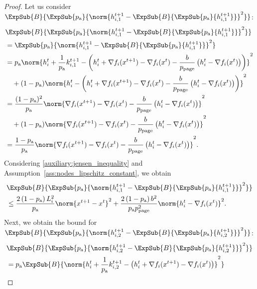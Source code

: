 \documentclass{article}
\newcommand*{\probavailable}{\ensuremath{p_{\textnormal{a}}}}
\newcommand*{\probpage}{\ensuremath{p_{\text{page}}}}
\begin{document}
\begin{proof}
  Let us consider $\ExpSub{B}{\ExpSub{\probavailable}{\norm{h^{t+1}_{i,1} - \ExpSub{B}{\ExpSub{\probavailable}{h^{t+1}_{i,1}}}}^2}}$:
  \begin{align*}
    &\ExpSub{B}{\ExpSub{\probavailable}{\norm{h^{t+1}_{i,1} - \ExpSub{B}{\ExpSub{\probavailable}{h^{t+1}_{i,1}}}}^2}}\\
    &=\ExpSub{\probavailable}{\norm{h^{t+1}_{i,1} - \ExpSub{B}{\ExpSub{\probavailable}{h^{t+1}_{i,1}}}}^2} \\
    &=\probavailable \norm{h^t_i + \frac{1}{\probavailable} k^{t+1}_{i, 1} - \left(h^t_i + \nabla f_i(x^{t+1}) - \nabla f_i(x^{t}) - \frac{b}{\probpage} \left(h^t_i - \nabla f_i(x^{t})\right)\right)}^2 \\
    &\quad + (1 - \probavailable) \norm{h^t_i - \left(h^t_i + \nabla f_i(x^{t+1}) - \nabla f_i(x^{t}) - \frac{b}{\probpage} \left(h^t_i - \nabla f_i(x^{t})\right)\right)}^2 \\
    &=\frac{(1 - \probavailable)^2}{\probavailable} \norm{\nabla f_i(x^{t+1}) - \nabla f_i(x^{t}) - \frac{b}{\probpage} \left(h^t_i - \nabla f_i(x^{t})\right)}^2 \\
    &\quad + (1 - \probavailable) \norm{\nabla f_i(x^{t+1}) - \nabla f_i(x^{t}) - \frac{b}{\probpage} \left(h^t_i - \nabla f_i(x^{t})\right)}^2 \\
    &=\frac{1 - \probavailable}{\probavailable} \norm{\nabla f_i(x^{t+1}) - \nabla f_i(x^{t}) - \frac{b}{\probpage} \left(h^t_i - \nabla f_i(x^{t})\right)}^2.
  \end{align*}
  Considering \eqref{auxiliary:jensen_inequality} and Assumption~\ref{ass:nodes_lipschitz_constant}, we obtain
  \begin{align}
    &\ExpSub{B}{\ExpSub{\probavailable}{\norm{h^{t+1}_{i,1} - \ExpSub{B}{\ExpSub{\probavailable}{h^{t+1}_{i,1}}}}^2}} \nonumber\\
    &\leq \frac{2\left(1 - \probavailable\right)L_i^2}{\probavailable} \norm{x^{t+1} - x^{t}}^2 + \frac{2\left(1 - \probavailable\right)b^2}{\probavailable \probpage^2} \norm{h^t_i - \nabla f_i(x^{t})}^2 \label{eq:page_proof:mini:h_1}.
  \end{align}
  Next, we obtain the bound for $\ExpSub{B}{\ExpSub{\probavailable}{\norm{h^{t+1}_{i,2} - \ExpSub{B}{\ExpSub{\probavailable}{h^{t+1}_{i,2}}}}^2}}$:
  \begin{align}
    &\ExpSub{B}{\ExpSub{\probavailable}{\norm{h^{t+1}_{i,2} - \ExpSub{B}{\ExpSub{\probavailable}{h^{t+1}_{i,2}}}}^2}} \nonumber \\
    &= \probavailable \ExpSub{B}{\norm{h^t_i + \frac{1}{\probavailable} k^{t+1}_{i, 2} - \left(h^t_i + \nabla f_i(x^{t+1}) - \nabla f_i(x^{t})\right)}^2} \nonumber\\

\end{align}
\end{proof}
\end{document}
